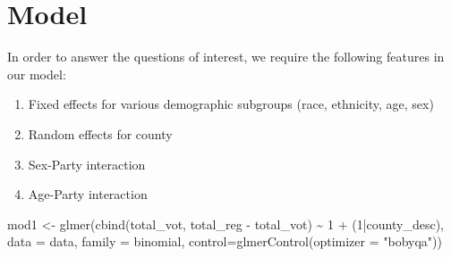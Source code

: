 \documentclass[
]{article}
\newenvironment{Shaded}{\begin{snugshade}}{\end{snugshade}}
\newcommand{\AttributeTok}[1]{\textcolor[rgb]{0.77,0.63,0.00}{#1}}
\newcommand{\DecValTok}[1]{\textcolor[rgb]{0.00,0.00,0.81}{#1}}
\newcommand{\FunctionTok}[1]{\textcolor[rgb]{0.00,0.00,0.00}{#1}}
\newcommand{\NormalTok}[1]{#1}
\newcommand{\OtherTok}[1]{\textcolor[rgb]{0.56,0.35,0.01}{#1}}
\newcommand{\SpecialCharTok}[1]{\textcolor[rgb]{0.00,0.00,0.00}{#1}}
\newcommand{\StringTok}[1]{\textcolor[rgb]{0.31,0.60,0.02}{#1}}
\providecommand{\tightlist}{%
  \setlength{\itemsep}{0pt}\setlength{\parskip}{0pt}}
\begin{document}
\hypertarget{model}{%
\section{Model}\label{model}}

In order to answer the questions of interest, we require the following
features in our model:

\begin{enumerate}
\def\labelenumi{\arabic{enumi}.}
\tightlist
\item
  Fixed effects for various demographic subgroups (race, ethnicity, age,
  sex)
\item
  Random effects for county
\item
  Sex-Party interaction
\item
  Age-Party interaction
\end{enumerate}

\begin{Shaded}
\begin{Highlighting}[]
\NormalTok{mod1 }\OtherTok{\textless{}{-}} \FunctionTok{glmer}\NormalTok{(}\FunctionTok{cbind}\NormalTok{(total\_vot, total\_reg }\SpecialCharTok{{-}}\NormalTok{ total\_vot) }\SpecialCharTok{\textasciitilde{}}
                      \DecValTok{1} \SpecialCharTok{+}\NormalTok{ (}\DecValTok{1}\SpecialCharTok{|}\NormalTok{county\_desc),}
                    \AttributeTok{data =}\NormalTok{ data, }\AttributeTok{family =}\NormalTok{ binomial,}
              \AttributeTok{control=}\FunctionTok{glmerControl}\NormalTok{(}\AttributeTok{optimizer =} \StringTok{"bobyqa"}\NormalTok{))}
\end{Highlighting}
\end{Shaded}
\end{document}
